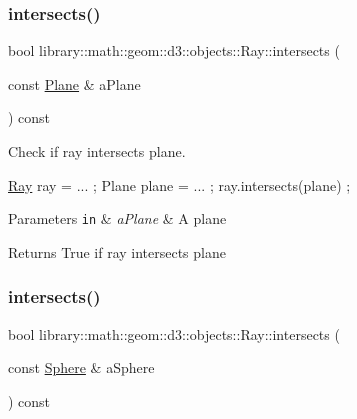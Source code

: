 \subsubsection{\texorpdfstring{intersects()}{intersects()}\hspace{0.1cm}{\footnotesize\ttfamily [2/4]}}
{\footnotesize\ttfamily bool library\+::math\+::geom\+::d3\+::objects\+::\+Ray\+::intersects (\begin{DoxyParamCaption}\item[{const \hyperlink{classlibrary_1_1math_1_1geom_1_1d3_1_1objects_1_1_plane}{Plane} \&}]{a\+Plane }\end{DoxyParamCaption}) const}



Check if ray intersects plane. 


\begin{DoxyCode}
\hyperlink{classlibrary_1_1math_1_1geom_1_1d3_1_1objects_1_1_ray_a11b7613464daaebc6e25a758b057f203}{Ray} ray = ... ;
Plane plane = ... ;
ray.intersects(plane) ;
\end{DoxyCode}



\begin{DoxyParams}[1]{Parameters}
\mbox{\tt in}  & {\em a\+Plane} & A plane \\
\hline
\end{DoxyParams}
\begin{DoxyReturn}{Returns}
True if ray intersects plane 
\end{DoxyReturn}
\mbox{\label{classlibrary_1_1math_1_1geom_1_1d3_1_1objects_1_1_ray_ab75f38e9f6f0e7160acdf5360089937b}} 
\subsubsection{\texorpdfstring{intersects()}{intersects()}\hspace{0.1cm}{\footnotesize\ttfamily [3/4]}}
{\footnotesize\ttfamily bool library\+::math\+::geom\+::d3\+::objects\+::\+Ray\+::intersects (\begin{DoxyParamCaption}\item[{const \hyperlink{classlibrary_1_1math_1_1geom_1_1d3_1_1objects_1_1_sphere}{Sphere} \&}]{a\+Sphere }\end{DoxyParamCaption}) const}



